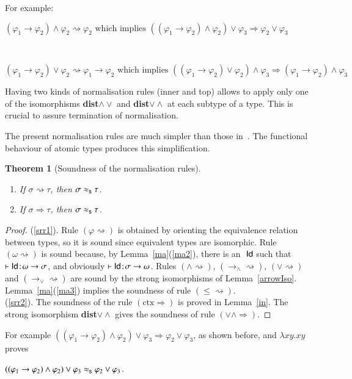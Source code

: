 \documentclass[UKenglish]{eptcs}
\newtheorem{theorem}[fact]{Theorem}
\newcommand{\dup}{\! : \!}
\newcommand{\tu}{\omega}
\newcommand{\tS}{\sigma}       \newcommand{\tT}{\tau}
\newcommand{\der}[3]{#1\vdash #2\dup #3}
\newcommand{\red}{\Longrightarrow}
\newcommand{\id}{{\sf Id}}
\newcommand{\labelx}[1]{\label{#1}}
\newcommand{\isos}{\approx_{\sf s}}
\newcommand{\myformula}[1]{\\[0.5pt]\centerline{#1}}
\newcommand{\rr}{\Rightarrow}
\begin{document}
For example:
\myformula{$ (\varphi_1\to\varphi_2)\wedge\varphi_2\rightsquigarrow\varphi_2\text{ which implies }
((\varphi_1\to\varphi_2)\wedge\varphi_2)\vee\varphi_3\red\varphi_2\vee\varphi_3$}
\myformula{$(\varphi_1\to\varphi_2)\vee\varphi_2\rightsquigarrow\varphi_1\to\varphi_2\text{ which implies }
((\varphi_1\to\varphi_2)\vee\varphi_2)\wedge\varphi_3\red(\varphi_1\to\varphi_2)\wedge\varphi_3$}

\smallskip

Having two kinds of normalisation rules (inner and top) allows to apply only one of  the isomorphisms  \mbox{\rm{\bfseries dist$\wedge\vee$}} and \mbox{\rm{\bfseries dist$\vee \wedge$}} at each subtype of a type. This is crucial to assure termination of normalisation.

The present normalisation rules are much simpler than those in~\cite{CDMZ13a}. The functional behaviour of atomic types produces this simplification.
\begin{theorem}[Soundness of the normalisation rules]\labelx{srr}
\begin{enumerate}
\item \labelx{srr1}If $\tS \rightsquigarrow \tT$, then $\tS \isos \tT$.
\item \labelx{srr2}If $\tS \red \tT$, then $\tS \isos \tT$.
\end{enumerate}
\end{theorem}
\begin{proof}
(\ref{srr1}). Rule $(\varphi\rightsquigarrow)$ is obtained by orienting the equivalence relation between types, so it is sound since equivalent types are isomorphic. Rule $(\tu\rightsquigarrow)$ is sound because, by Lemma~\ref{ma}(\ref{ma2}), there is  an \fhi    $\;\id$  such that $\der{}\id{\omega \to  \tS}$, and obviously $\der{}{\id}{\tS \to  \omega}$.  Rules $(\wedge\rightsquigarrow)$,   $(\to_\wedge\rightsquigarrow)$, $(\vee\rightsquigarrow)$ and $(\to_\vee\rightsquigarrow)$  are sound by the strong isomorphisms of Lemma~\ref{arrowIso}.
 Lemma~\ref{ma}(\ref{ma3}) implies the soundness of rule $(\leq\rightsquigarrow)$. \\
(\ref{srr2}). The soundness of the rule $(\text{ctx}\rr)$ is proved in Lemma~\ref{in}. The strong isomorphism \mbox{\rm{\bfseries dist$\vee\wedge$}} gives the soundness of rule $(\vee\wedge\rr)$.

\end{proof}
For example $((\varphi_1\to\varphi_2)\wedge\varphi_2)\vee\varphi_3\red\varphi_2\vee\varphi_3$, as shown before, and  $\lambda xy.xy$ proves \myformula{$((\varphi_1\to\varphi_2)\wedge\varphi_2)\vee\varphi_3\isos\varphi_2\vee\varphi_3$.}
\end{document}
